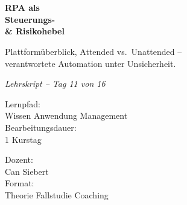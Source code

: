 \documentclass[11pt,a4paper,oneside]{article}
\newcommand{\caveatfontfallback}{\itshape}
\newcommand\caveatfont{\caveatfontfallback}%
\begin{document}
\begin{titlepage}
  \pagestyle{empty}
  \vspace*{1.5cm}
  \\[2pt]
  \noindent{\color{lpAccent}\rule{\linewidth}{1.2pt}}\\[4pt]

  \vspace{3cm}
  {\sffamily\fontsize{30}{34}\selectfont\bfseries\color{lpInk}RPA als\\Steuerungs-\\\& Risikohebel\par}

  \vspace{0.7cm}
  {\sffamily\large\color{lpGray}Plattformüberblick, Attended vs.\ Unattended --\\verantwortete Automation unter Unsicherheit.\par}

  \vspace{1.5cm}
  {\caveatfont\LARGE\color{lpAmber}Lehrskript -- Tag 11 von 16}\par

  \vfill

  \noindent\begin{minipage}{0.55\linewidth}
    {\sffamily\footnotesize\color{lpGray}Lernpfad:}\\
    {\sffamily\small\color{lpInk}Wissen \textrightarrow{} Anwendung \textrightarrow{} Management}\\[10pt]
    {\sffamily\footnotesize\color{lpGray}Bearbeitungsdauer:}\\
    {\sffamily\small\color{lpInk}1 Kurstag}
  \end{minipage}\hfill
  \begin{minipage}{0.4\linewidth}
    \raggedleft
    {\sffamily\footnotesize\color{lpGray}Dozent:}\\
    {\sffamily\small\color{lpInk}Can Siebert}\\[10pt]
    {\sffamily\footnotesize\color{lpGray}Format:}\\
    {\sffamily\small\color{lpInk}Theorie \textperiodcentered{} Fallstudie \textperiodcentered{} Coaching}
  \end{minipage}

  \vspace{0.5cm}
  \noindent{\color{lpAccent}\rule{\linewidth}{0.6pt}}
\end{titlepage}
\end{document}
